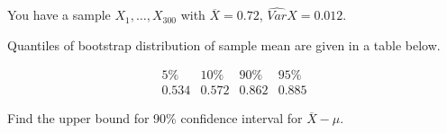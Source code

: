 
\begin{question}
You have a sample \(X_1, \dots, X_{300}\) with \(\overline{X}= 0.72\), \(\widehat{Var}{X} = 0.012\).

Quantiles of bootstrap distribution of sample mean are given in a table below.

\[
\begin{array}{c|c|c|c}
5 \% & 10 \% & 90 \% & 95 \% \\
\hline
0.534 & 0.572 & 0.862 & 0.885
\end{array}
\]

Find the upper bound for 90\% confidence interval for \(\overline{X}-\mu\).
\end{question}


